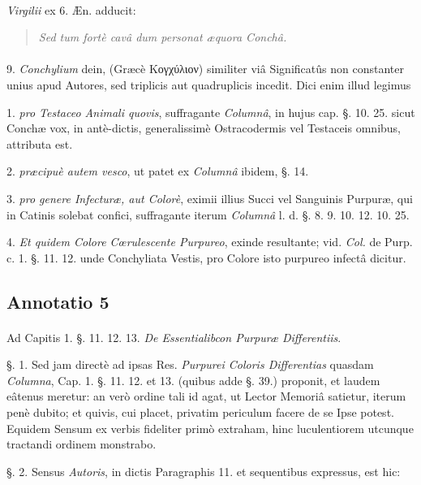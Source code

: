 \documentclass[a4paper, 11pt, oneside, polutonikogreek, german]{article}
\begin{document}
\paragraph{}
\emph{Virgilii} ex 6. Æn. adducit:
\begin{quotation}
\emph{Sed tum fortè cavâ dum personat æquora Conchâ.}  
\end{quotation}
\paragraph{}
9. \emph{Conchylium} dein, (Græcè Κογχύλιον) similiter viâ Significatûs non constanter unius apud Autores, sed triplicis aut quadruplicis incedit. Dici enim illud legimus

1. \emph{pro Testaceo Animali quovis}, suffragante \emph{Columnâ}, in hujus cap. §. 10. 25. sicut Conchæ vox, in antè-dictis, generalissimè Ostracodermis vel Testaceis omnibus, attributa est.

2. \emph{præcipuè autem vesco}, ut patet ex \emph{Columnâ} ibidem, §. 14.

3. \emph{pro genere Infecturæ, aut Colorè}, eximii illius Succi vel Sanguinis Purpuræ, qui in Catinis solebat confici, suffragante iterum \emph{Columnâ} l. d. §. 8. 9. 10. 12. 10. 25.

4. \emph{Et quidem Colore Cœrulescente Purpureo}, exinde resultante; vid. \emph{Col.} de Purp. c. 1. §. 11. 12. unde Conchyliata Vestis, pro Colore isto purpureo infectâ dicitur.

\subsection{Annotatio 5}
\paragraph{}
Ad Capitis 1. §. 11. 12. 13. \emph{De Essentialibcon Purpuræ Differentiis}.

§. 1. Sed jam directè ad ipsas Res. \emph{Purpurei Coloris Differentias} quasdam \emph{Columna}, Cap. 1. §. 11. 12. et 13. (quibus adde §. 39.) proponit, et laudem eâtenus meretur: an verò ordine tali id agat, ut Lector Memoriâ satietur, iterum penè dubito; et quivis, cui placet, privatim periculum facere de se Ipse potest. Equidem Sensum ex verbis fideliter primò extraham, hinc luculentiorem utcunque tractandi ordinem monstrabo.

§. 2. Sensus \emph{Autoris}, in dictis Paragraphis 11. et sequentibus expressus, est hic:
\end{document}
